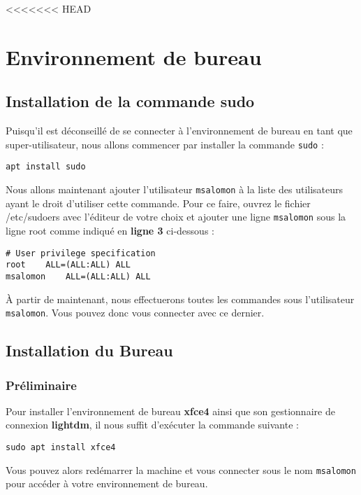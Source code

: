 <<<<<<< HEAD
\chapter{Environnement de bureau}

\section{Installation de la commande sudo}

Puisqu'il est déconseillé de se connecter à l'environnement de bureau en tant que super-utilisateur, nous allons commencer par installer la commande \texttt{sudo} :

\begin{lstlisting}
apt install sudo
\end{lstlisting}

Nous allons maintenant ajouter l'utilisateur \texttt{msalomon} à la liste des utilisateurs ayant le droit d'utiliser cette commande. Pour ce faire, ouvrez le fichier /etc/sudoers avec l'éditeur de votre choix et ajouter une ligne \texttt{msalomon} sous la ligne root comme indiqué en \textbf{ligne 3} ci-dessous :

\begin{lstlisting}[style=tf]
# User privilege specification
root	ALL=(ALL:ALL) ALL
msalomon	ALL=(ALL:ALL) ALL
\end{lstlisting}

À partir de maintenant, nous effectuerons toutes les commandes sous l'utilisateur \texttt{msalomon}. Vous pouvez donc vous connecter avec ce dernier.

\section{Installation du Bureau}

\subsection{Préliminaire}

Pour installer l'environnement de bureau \textbf{xfce4} ainsi que son gestionnaire de connexion \textbf{lightdm}, il nous suffit d'exécuter la commande suivante :

\begin{lstlisting}
sudo apt install xfce4
\end{lstlisting}

Vous pouvez alors redémarrer la machine et vous connecter sous le nom \texttt{msalomon} pour accéder à votre environnement de bureau.

